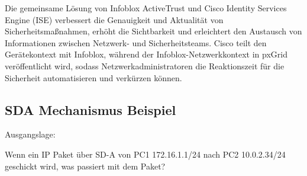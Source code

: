 Die gemeinsame Lösung von Infoblox ActiveTrust und Cisco Identity Services Engine (ISE) verbessert die Genauigkeit und Aktualität von Sicherheitsmaßnahmen, erhöht die Sichtbarkeit und erleichtert den Austausch von Informationen zwischen Netzwerk- und Sicherheitsteams. Cisco teilt den Gerätekontext mit Infoblox, während der Infoblox-Netzwerkkontext in pxGrid veröffentlicht wird, sodass Netzwerkadministratoren die Reaktionszeit für die Sicherheit automatisieren und verkürzen können.\cite{infoblox-communityblog}



\subsection{SDA Mechanismus Beispiel}

Ausgangslage:

Wenn ein IP Paket über SD-A von PC1 172.16.1.1/24 nach PC2 10.0.2.34/24 geschickt wird, was passiert mit dem Paket?

